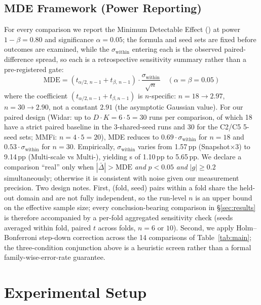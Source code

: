 \documentclass[journal,11pt]{IEEEtran}
\newcommand{\MDE}{\text{MDE}}
\newcommand{\Rx}{\text{Rx}}
\begin{document}
\subsection{MDE Framework (Power Reporting)}
For every comparison we report the Minimum Detectable Effect (\MDE) at power $1 - \beta = 0.80$ and significance $\alpha = 0.05$; the formula and seed sets are fixed before outcomes are examined, while the $\sigma_{\text{within}}$ entering each \MDE{} is the observed paired-difference spread, so each \MDE{} is a retrospective sensitivity summary rather than a pre-registered gate:
\begin{equation}
\MDE{} = (t_{\alpha/2,\,n-1} + t_{\beta,\,n-1}) \cdot \frac{\sigma_{\text{within}}}{\sqrt{n}} \quad (\alpha = \beta = 0.05)
\label{eq:mde}
\end{equation}
where the coefficient $(t_{\alpha/2,n-1} + t_{\beta,n-1})$ is $n$-specific: $n = 18 \to 2.97$, $n = 30 \to 2.90$, not a constant $2.91$ (the asymptotic Gaussian value).
For our paired design (Widar: up to $D \cdot K = 6 \cdot 5 = 30$ runs per comparison, of which 18 have a strict paired baseline in the 3-shared-seed runs and 30 for the C2/C5 5-seed sets; MMFi: $n = 4 \cdot 5 = 20$), MDE reduces to $0.69 \cdot \sigma_{\text{within}}$ for $n = 18$ and $0.53 \cdot \sigma_{\text{within}}$ for $n = 30$. Empirically, $\sigma_{\text{within}}$ varies from 1.57\,pp (Snapshot$\times$3) to 9.14\,pp (Multi-scale vs Multi-\Rx), yielding \MDE{}s of 1.10\,pp to 5.65\,pp. We declare a comparison ``real'' only when $|\bar{\Delta}| > \MDE$ \emph{and} $p < 0.05$ \emph{and} $|g| \geq 0.2$ simultaneously; otherwise it is consistent with noise given our measurement precision. Two design notes. First, (fold, seed) pairs within a fold share the held-out domain and are not fully independent, so the run-level $n$ is an upper bound on the effective sample size; every conclusion-bearing comparison in \S\ref{sec:results} is therefore accompanied by a per-fold aggregated sensitivity check (seeds averaged within fold, paired $t$ across folds, $n = 6$ or $10$). Second, we apply Holm--Bonferroni step-down correction across the 14 comparisons of Table~\ref{tab:main}; the three-condition conjunction above is a heuristic screen rather than a formal family-wise-error-rate guarantee.

\section{Experimental Setup}
\label{sec:setup}
\end{document}
